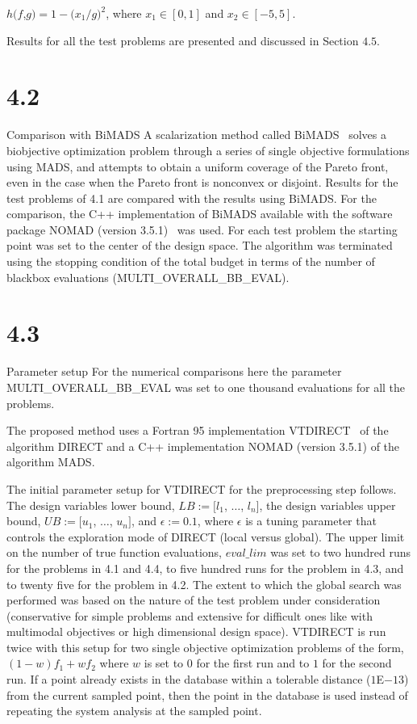 \noindent $h(f$,$g) = 1-{\bigl(x_1/g\bigr)}^2$, where $x_1\in [0,1]$ and 
$x_2 \in [-5,5]$.

Results for all the test problems are presented and discussed in Section $4.5$.

\section{4.2}{Comparison with BiMADS}
A scalarization method called BiMADS \ASZ\ solves a biobjective optimization 
problem through a series of single objective formulations using MADS, and 
attempts to obtain a uniform coverage of the Pareto front, even in the case 
when the Pareto front is nonconvex or disjoint. Results for the test problems 
of 4.1 are compared with the results using BiMADS. For the comparison, the 
C++ implementation of BiMADS available with the software package NOMAD (version 
3.5.1) \DT\ was used. For each test problem the starting point was set to the 
center of the design space. The algorithm was terminated using the stopping 
condition of the total budget in terms of the number of blackbox evaluations 
(MULTI\_OVERALL\_BB\_EVAL). 

\section{4.3}{Parameter setup}
For the numerical comparisons here the parameter MULTI\_OVERALL\_BB\_EVAL 
was set to one thousand evaluations for all the problems.

The proposed method uses a Fortran 95 implementation VTDIRECT \HWRSVJBT\ of the 
algorithm DIRECT and a C++ implementation NOMAD (version 3.5.1) of the 
algorithm MADS.
 
The initial parameter setup for VTDIRECT for the preprocessing step follows. 
The design variables lower bound, $LB := [l_1$, $\ldots$, $l_n]$, the design 
variables upper bound, $UB := [u_1$, $\ldots$, $u_n]$, and $\epsilon := 0.1$, 
where $\epsilon$ is a tuning parameter that controls the exploration mode of 
DIRECT (local versus global). The upper limit on the number of true function 
evaluations, $eval\_lim$ was set to two hundred runs for the problems in  
4.1 and 4.4, to five hundred runs for the problem in 4.3, and to twenty five 
for the problem in 4.2. The extent to which the global search was performed 
was based on the nature of the test problem under consideration (conservative 
for simple problems and extensive for difficult ones like with multimodal 
objectives or high dimensional design space). VTDIRECT is run twice with this 
setup for two single objective optimization problems of the form, 
$(1-w)f_1+wf_2$ where $w$ is set to $0$ for the first run and to $1$ for the 
second run. If a point already exists in the database within a tolerable 
distance ($1$E$-13$) from the current sampled point, then the point in the 
database is used instead of repeating the system analysis at the sampled point. 

